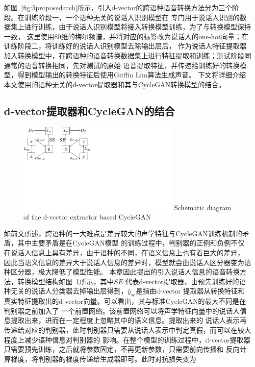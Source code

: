 如图~\ref{fig:5proposedarch}所示，引入d-vector的跨语种语音转换方法分为三个阶段。在训练阶段一，一个语种无关的说话人识别模型在
专门用于说话人识别的数据集上进行训练，由于说话人识别模型将接入转换模型训练，为了与转换模型保持一致，
这里使用80维的梅尔频谱，并将对应的标签改为说话人的one-hot向量；在训练阶段二，将训练好的说话人识别模型去除输出层后，
作为说话人特征提取器加入转换模型中，在跨语种的语音转换数据集上进行特征提取和训练；测试阶段同通常的语音转换相同，先对测试的原始
语音提取特征，并传递给训练好的转换模型，得到模型输出的转换特征后使用Griffin Lim算法生成声音。
下文将详细介绍本文使用的语种无关的d-vector提取器和其与CycleGAN转换模型的结合。



\subsection{d-vector提取器和CycleGAN的结合}

\begin{figure}[!htp]
    \centering
    \includegraphics[width=8cm,trim=0 230 370 0,clip]{figure/5_dvectorcyclegan.pdf}
    {Schematic diagram of the d-vector extractor based CycleGAN}
    \label{fig:dvectorcyclegan}
\end{figure}

如前文所述，跨语种的一大难点是差异较大的声学特征与CycleGAN训练机制的矛盾，其中主要矛盾是在CycleGAN模型
的训练过程中，判别器的正例和负例不仅在说话人信息上具有差异，由于语种的不同，在语义信息上也有着巨大的差异，
因此当语义信息的差异大于说话人信息的差异时，模型就会由说话人区分器变为语种区分器，极大降低了模型性能。
本章因此提出的引入说话人信息的语音转换方法，转换模型结构如图~\ref{fig:dvectorcyclegan}所示，其中$SE$
代表d-vector提取器，由预先训练好的语种无关的说话人分类器去掉输出层得到，$\hat{y}_{se}$是指由d-vector
提取器从转换特征和真实特征提取出的d-vector向量。可以看出，其与标准CycleGAN的最大不同是在判别器之前加入了
一个前置网络。该前置网络可以将声学特征向量中的说话人信息提取出来，进而在一定程度上忽略其中的语义信息。提取出来的
说话人表示再传递给对应的判别器，此时判别器只需要从说话人表示中判定真假，而可以在较大程度上减少语种信息对判别器的
影响。在整个模型的训练过程中，d-vector提取器只需要预先训练，之后就将参数固定，不再更新参数，只需要前向传播和
反向计算梯度，将判别器的梯度传递给生成器即可。此时对抗损失变为

